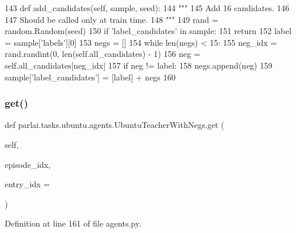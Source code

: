 \begin{DoxyCode}
143     \textcolor{keyword}{def }add\_candidates(self, sample, seed):
144         \textcolor{stringliteral}{"""}
145 \textcolor{stringliteral}{        Add 16 candidates.}
146 \textcolor{stringliteral}{}
147 \textcolor{stringliteral}{        Should be called only at train time.}
148 \textcolor{stringliteral}{        """}
149         rand = random.Random(seed)
150         \textcolor{keywordflow}{if} \textcolor{stringliteral}{'label\_candidates'} \textcolor{keywordflow}{in} sample:
151             \textcolor{keywordflow}{return}
152         label = sample[\textcolor{stringliteral}{'labels'}][0]
153         negs = []
154         \textcolor{keywordflow}{while} len(negs) < 15:
155             neg\_idx = rand.randint(0, len(self.all\_candidates) - 1)
156             neg = self.all\_candidates[neg\_idx]
157             \textcolor{keywordflow}{if} neg != label:
158                 negs.append(neg)
159         sample[\textcolor{stringliteral}{'label\_candidates'}] = [label] + negs
160 
\end{DoxyCode}
\mbox{\label{classparlai_1_1tasks_1_1ubuntu_1_1agents_1_1UbuntuTeacherWithNegs_a47304c2339835e7942ae190d4b17fc2d}} 
\subsubsection{\texorpdfstring{get()}{get()}}
{\footnotesize\ttfamily def parlai.\+tasks.\+ubuntu.\+agents.\+Ubuntu\+Teacher\+With\+Negs.\+get (\begin{DoxyParamCaption}\item[{}]{self,  }\item[{}]{episode\+\_\+idx,  }\item[{}]{entry\+\_\+idx = {} }\end{DoxyParamCaption})}



Definition at line 161 of file agents.\+py.


